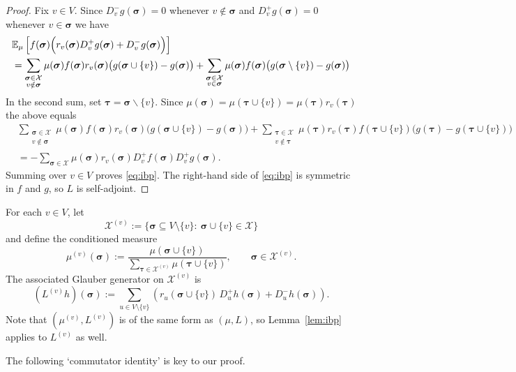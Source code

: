 \documentclass[10pt,a4paper]{amsart}
\newcommand{\E}{\mathbb{E}}
\newcommand{\sigmabf}{ \boldsymbol{\sigma} }
\newcommand{\taubf}{ \boldsymbol{\tau} }
\begin{document}
	\begin{proof}
		Fix $v\in V$. Since $D_v^-g(\sigmabf)=0$ whenever $v\notin \sigmabf$ and $D_v^+g(\sigmabf)=0$ whenever $v\in \sigmabf$ we have
		\begin{align*}
			&\E_\mu\left[f(\sigmabf)\Bigl(r_v(\sigmabf)D_v^+g(\sigmabf)+D_v^-g(\sigmabf)\Bigr)\right] \\
			&=
			\sum_{\substack{\sigmabf\in\mathcal X\\ v\notin \sigmabf}}
			\mu(\sigmabf)f(\sigmabf)r_v(\sigmabf)\bigl(g(\sigmabf\cup\{v\})-g(\sigmabf)\bigr)
			+
			\sum_{\substack{\sigmabf\in\mathcal X\\ v\in \sigmabf}}
			\mu(\sigmabf)f(\sigmabf)\bigl(g(\sigmabf\setminus\{v\})-g(\sigmabf)\bigr)
		\end{align*}
		In the second sum, set $\taubf=\sigmabf\backslash\{v\}$. 
		Since
		\(
		\mu(\sigmabf)=\mu(\taubf \cup\{v\})=\mu(\taubf)r_v(\taubf)
		\)
		the above equals
		\begin{align*}
			&\sum_{\substack{\sigmabf\in\mathcal X\\ v\notin \sigmabf}}
			\mu(\sigmabf)f(\sigmabf)r_v(\sigmabf)\bigl(g(\sigmabf\cup\{v\})-g(\sigmabf)\bigr)
			+
			\sum_{\substack{\taubf\in\mathcal X\\ v\notin \taubf}}
			\mu(\taubf)r_v(\taubf) f(\taubf \cup\{v\})\bigl(g(\taubf)-g(\taubf \cup\{v\})\bigr) \\
			&=
			-\sum_{\sigmabf\in\mathcal X}
			\mu(\sigmabf)r_v(\sigmabf) D_v^+f(\sigmabf) D_v^+g(\sigmabf).
		\end{align*}
		Summing over $v\in V$ proves \eqref{eq:ibp}.
		The right-hand side of \eqref{eq:ibp} is symmetric in $f$ and $g$, so $L$ is self-adjoint. 
	\end{proof}
	
	
	
	For each $v\in V$, let
	\[
	\mathcal X^{(v)}:=\{\sigmabf\subseteq V\setminus\{v\}:\ \sigmabf\cup\{v\}\in \mathcal X\}
	\]
	and define the conditioned measure
	\[
	\mu^{(v)}(\sigmabf)
	:=
	\frac{\mu(\sigmabf\cup\{v\})}
	{\sum_{\taubf\in\mathcal X^{(v)}}\mu(\taubf\cup\{v\})},
	\qquad \sigmabf\in \mathcal X^{(v)}.
	\]
	The associated Glauber generator on $\mathcal X^{(v)}$ is
	\[
	(L^{(v)}h)(\sigmabf)
	:=
	\sum_{u\in V\setminus\{v\}}
	\left(
	r_u(\sigmabf\cup\{v\})\,D_u^+h(\sigmabf)+D_u^-h(\sigmabf)
	\right).
	\]
	Note that $(\mu^{(v)},L^{(v)})$ is of the same form as $(\mu,L)$, so Lemma~\ref{lem:ibp}
	applies to $L^{(v)}$ as well.
	
	The following `commutator identity' is key to our proof.
	
\end{document}
